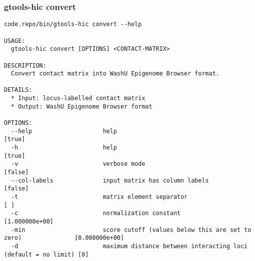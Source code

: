 \subsubsection{gtools-hic convert}\label{gtools-hic_convert}
\begin{lstlisting}
code.repo/bin/gtools-hic convert --help

USAGE:
  gtools-hic convert [OPTIONS] <CONTACT-MATRIX>

DESCRIPTION:
  Convert contact matrix into WashU Epigenome Browser format.

DETAILS:
  * Input: locus-labelled contact matrix
  * Output: WashU Epigenome Browser format

OPTIONS:
  --help                    help                                                           [true]
  -h                        help                                                           [true]
  -v                        verbose mode                                                   [false]
  --col-labels              input matrix has column labels                                 [false]
  -t                        matrix element separator                                       [ ]
  -c                        normalization constant                                         [1.000000e+00]
  -min                      score cutoff (values below this are set to zero)               [0.000000e+00]
  -d                        maximum distance between interacting loci (default = no limit) [0]
\end{lstlisting}
\clearpage